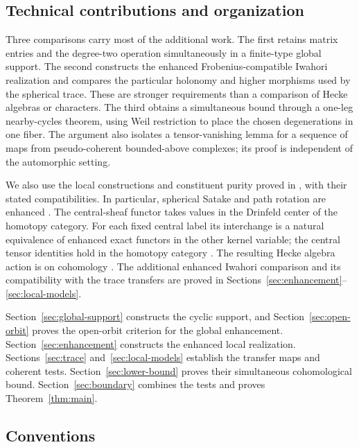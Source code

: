 \documentclass[11pt]{article}
\numberwithin{equation}{section}
\theoremstyle{definition}
\theoremstyle{remark}
\begin{document}
\subsection{Technical contributions and organization}

Three comparisons carry most of the additional work.  The first
retains matrix entries and the degree-two operation simultaneously
in a finite-type global support.  The second constructs the enhanced
Frobenius-compatible Iwahori realization and compares the particular
holonomy and higher morphisms used by the spherical trace.  These
are stronger requirements than a comparison of Hecke algebras or
characters.  The third obtains a simultaneous bound through a
one-leg nearby-cycles theorem, using Weil restriction to place the
chosen degenerations in one fiber.  The argument also isolates a
tensor-vanishing lemma for a sequence of maps from
pseudo-coherent bounded-above complexes; its proof is independent
of the automorphic setting.

We also use the local constructions and constituent purity proved in
\cite[Sections~2--3 and Lemma~6.4]{Parent}, with their stated
compatibilities.  In particular, spherical Satake and path rotation
are enhanced \cite[Theorem~2.2 and Proposition~2.5]{Parent}.
The central-sheaf functor takes values in the Drinfeld center of the
homotopy category.  For each fixed central label its interchange is
a natural equivalence of enhanced exact functors in the other kernel
variable; the central tensor identities hold in the homotopy category
\cite[Theorem~2.3]{Parent}.
The resulting Hecke algebra action is on cohomology
\cite[Proposition~2.6]{Parent}.
The additional enhanced Iwahori comparison and its compatibility
with the trace transfers are proved in
Sections~\ref{sec:enhancement}--\ref{sec:local-models}.

Section~\ref{sec:global-support} constructs the cyclic support, and
Section~\ref{sec:open-orbit} proves the open-orbit criterion for the
global enhancement.  Section~\ref{sec:enhancement} constructs the
enhanced local realization.  Sections~\ref{sec:trace}
and~\ref{sec:local-models} establish the transfer maps and coherent
tests.  Section~\ref{sec:lower-bound} proves their simultaneous
cohomological bound.  Section~\ref{sec:boundary} combines the tests
and proves Theorem~\ref{thm:main}.

\subsection{Conventions}
\end{document}
